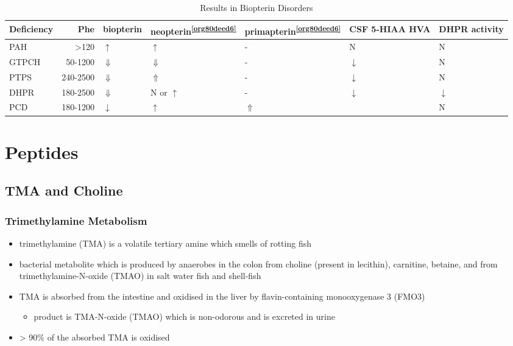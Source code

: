 \documentclass{scrartcl}
\begin{document}
\begin{table}[htbp]
\caption{\label{tab:orga4e7888}
Results in Biopterin Disorders}
\centering
\begin{tabular}{lrlllll}
Deficiency & Phe & biopterin\footnotemark & neopterin\textsuperscript{\ref{org80deed6}} & primapterin\textsuperscript{\ref{org80deed6}} & CSF 5-HIAA HVA & DHPR activity\\
\hline
PAH & \textgreater{}120 & \(\uparrow\) & \(\uparrow\) & - & N & N\\
GTPCH & 50-1200 & \(\Downarrow\) & \(\Downarrow\) & - & \(\downarrow\) & N\\
PTPS & 240-2500 & \(\Downarrow\) & \(\Uparrow\) & - & \(\downarrow\) & N\\
DHPR & 180-2500 & \(\Downarrow\) & N or \(\uparrow\) & - & \(\downarrow\) & \(\downarrow\)\\
PCD & 180-1200 & \(\downarrow\) & \(\uparrow\) & \(\Uparrow\) &  & N\\
\end{tabular}
\end{table}
\section{Peptides}
\label{sec:orgb9c53e2}
\subsection{TMA and Choline}
\label{sec:org9ef3783}
\subsubsection{Trimethylamine Metabolism}
\label{sec:orge266e4b}
\begin{itemize}
\item trimethylamine (TMA) is a volatile tertiary amine which smells of rotting fish
\item bacterial metabolite which is produced by anaerobes in the colon
from choline (present in lecithin), carnitine, betaine, and from
trimethylamine-N-oxide (TMAO) in salt water fish and shell-fish
\item TMA is absorbed from the intestine and oxidised in the liver by
flavin-containing monooxygenase 3 (FMO3)
\begin{itemize}
\item product is TMA-N-oxide (TMAO) which is non-odorous and is
excreted in urine
\end{itemize}
\item \textgreater{} 90\% of the absorbed TMA is oxidised
\end{itemize}
\end{document}
